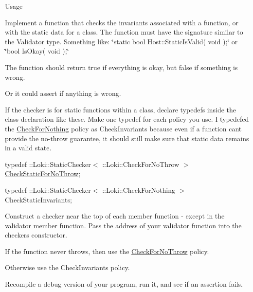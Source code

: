 \begin{DoxyParagraph}{Usage}
\begin{DoxyEnumerate}
\item Implement a function that checks the invariants associated with a function, or with the static data for a class. The function must have the signature similar to the \hyperlink{structValidator}{Validator} type. Something like\+: \char`\"{}static bool Host\+::\+Static\+Is\+Valid( void );\char`\"{} or \char`\"{}bool Is\+Okay( void );\char`\"{}
\begin{DoxyItemize}
\item The function should return true if everything is okay, but false if something is wrong.
\item Or it could assert if anything is wrong.
\end{DoxyItemize}
\item If the checker is for static functions within a class, declare typedef\textquotesingle{}s inside the class declaration like these. Make one typedef for each policy you use. I typedef\textquotesingle{}ed the \hyperlink{classLoki_1_1CheckForNothing}{Check\+For\+Nothing} policy as Check\+Invariants because even if a function can\textquotesingle{}t provide the no-\/throw guarantee, it should still make sure that static data remains in a valid state.
\begin{DoxyItemize}
\item typedef \+::\+Loki\+::\+Static\+Checker$<$ \+::\+Loki\+::\+Check\+For\+No\+Throw $>$ \hyperlink{classLoki_1_1CheckStaticForNoThrow}{Check\+Static\+For\+No\+Throw};
\item typedef \+::\+Loki\+::\+Static\+Checker$<$ \+::\+Loki\+::\+Check\+For\+Nothing $>$ Check\+Static\+Invariants;
\end{DoxyItemize}
\item Construct a checker near the top of each member function -\/ except in the validator member function. Pass the address of your validator function into the checker\textquotesingle{}s constructor.
\begin{DoxyItemize}
\item If the function never throws, then use the \hyperlink{classLoki_1_1CheckForNoThrow}{Check\+For\+No\+Throw} policy.
\item Otherwise use the Check\+Invariants policy.
\end{DoxyItemize}
\item Recompile a debug version of your program, run it, and see if an assertion fails. 
\end{DoxyEnumerate}
\end{DoxyParagraph}


